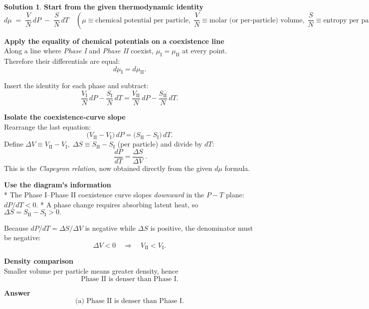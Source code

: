 \documentclass[12pt]{article}
\theoremstyle{definition} %
\newtheorem{solution}{Solution}
\theoremstyle{plain} %
\begin{document}
  \begin{solution}
    \textbf{Start from the given thermodynamic identity}
    \[
    d\mu \;=\; \frac{V}{N}\,dP \;-\; \frac{S}{N}\,dT
    \quad
    \left(
      \mu\equiv\text{chemical potential per particle},\;
      \frac{V}{N}\equiv\text{molar (or per‐particle) volume},\;
      \frac{S}{N}\equiv\text{entropy per particle}
    \right).
    \]
    
    \bigskip
    \textbf{Apply the equality of chemical potentials on a coexistence line}\\
    Along a line where \emph{Phase I} and \emph{Phase II} coexist,
    \(\mu_{\text{I}} = \mu_{\text{II}}\) at every point.  
    Therefore their differentials are equal:
    \[
    d\mu_{\text{I}} = d\mu_{\text{II}}.
    \]
    
    Insert the identity for each phase and subtract:
    \[
    \frac{V_{\text{I}}}{N}\,dP - \frac{S_{\text{I}}}{N}\,dT
    =
    \frac{V_{\text{II}}}{N}\,dP - \frac{S_{\text{II}}}{N}\,dT.
    \]
    
    \bigskip
    \textbf{Isolate the coexistence‐curve slope}\\
    Rearrange the last equation:
    \[
    \bigl(V_{\text{II}} - V_{\text{I}}\bigr)\,dP
    =
    \bigl(S_{\text{II}} - S_{\text{I}}\bigr)\,dT.
    \]
    Define
    \(\displaystyle
      \Delta V \equiv V_{\text{II}}-V_{\text{I}},\;
      \Delta S \equiv S_{\text{II}}-S_{\text{I}}
    \)
    (per particle) and divide by \(dT\):
    \[
    \boxed{\;
      \frac{dP}{dT}
      = \frac{\Delta S}{\Delta V}
    \;} .
    \]
    This is the \emph{Clapeyron relation}, now obtained directly from the
    given \(d\mu\) formula.
    
    \bigskip
    \textbf{Use the diagram’s information}\\
    * The Phase I–Phase II coexistence curve slopes \emph{downward} in the
      \(P\!-\!T\) plane: \(dP/dT<0.\)
    * A phase change requires absorbing latent heat, so
      \(\Delta S = S_{\text{II}}-S_{\text{I}} > 0.\)
    
    Because \(dP/dT = \Delta S / \Delta V\) is negative while \(\Delta S\) is
    positive, the denominator must be negative:
    \[
    \Delta V < 0
    \quad\Longrightarrow\quad
    V_{\text{II}} < V_{\text{I}}.
    \]
    
    \bigskip
    \textbf{Density comparison}\\
    Smaller volume per particle means greater density, hence
    \[
    \boxed{\text{Phase II is denser than Phase I.}}
    \]
    
    \bigskip
    \textbf{Answer}\\
    \[
    \text{(a) Phase II is denser than Phase I.}
    \]
    \end{solution}
\end{document}
